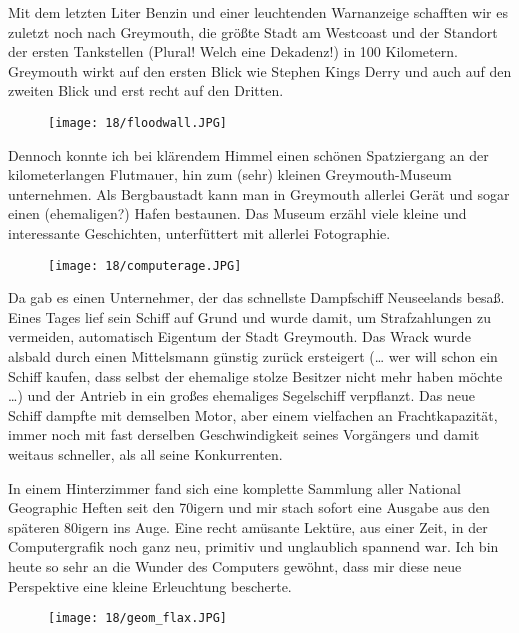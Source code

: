 Mit dem letzten Liter Benzin und einer leuchtenden Warnanzeige
schafften wir es zuletzt noch nach Greymouth, die größte Stadt am
Westcoast und der Standort der ersten Tankstellen (Plural!
Welch eine Dekadenz!) in 100 Kilometern. Greymouth wirkt auf den
ersten Blick wie Stephen Kings Derry und auch auf den zweiten Blick
und erst recht auf den Dritten.

\begin{figure}[h]
  \centering
  \texttt{[image: 18/floodwall.JPG]}
\end{figure}
Dennoch konnte ich bei klärendem Himmel einen schönen Spatziergang an
der kilometerlangen Flutmauer, hin zum (sehr) kleinen Greymouth-Museum
unternehmen. Als Bergbaustadt kann man in Greymouth allerlei Gerät und
sogar einen (ehemaligen?)  Hafen bestaunen. Das Museum erzähl viele
kleine und interessante Geschichten, unterfüttert mit allerlei
Fotographie.

\begin{figure}[h]
  \centering
  \texttt{[image: 18/computerage.JPG]}
\end{figure}

Da gab es einen Unternehmer, der das schnellste Dampfschiff
Neuseelands besaß. Eines Tages lief sein Schiff auf Grund und wurde
damit, um Strafzahlungen zu vermeiden, automatisch Eigentum der Stadt
Greymouth. Das Wrack wurde alsbald durch einen Mittelsmann günstig
zurück ersteigert (\ldots{} wer will schon ein Schiff kaufen, dass
selbst der ehemalige stolze Besitzer nicht mehr haben möchte \ldots{})
und der Antrieb in ein großes ehemaliges Segelschiff verpflanzt. Das
neue Schiff dampfte mit demselben Motor, aber einem vielfachen an
Frachtkapazität, immer noch mit fast derselben Geschwindigkeit seines
Vorgängers und damit weitaus schneller, als all seine Konkurrenten.

In einem Hinterzimmer fand sich eine komplette Sammlung aller National
Geographic Heften seit den 70igern und mir stach sofort eine Ausgabe
aus den späteren 80igern ins Auge. Eine recht amüsante Lektüre, aus
einer Zeit, in der Computergrafik noch ganz neu, primitiv und
unglaublich spannend war. Ich bin heute so sehr an die Wunder des
Computers gewöhnt, dass mir diese neue Perspektive eine kleine
Erleuchtung bescherte.

\begin{figure}[h]
  \centering
  \texttt{[image: 18/geom\_flax.JPG]}
\end{figure}

